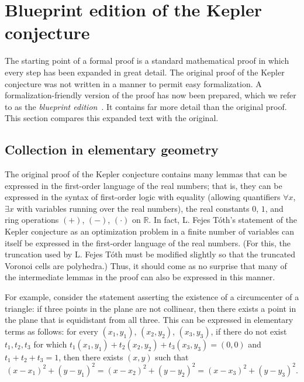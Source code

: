 \documentclass[11pt]{amsart}
\newcommand{\ring}[1]{\mathbb{#1}}
\begin{document}
\section{Blueprint edition of the Kepler conjecture}
\label{sec:blueprint}

The starting point of a formal proof is a standard mathematical proof in which every step
has been expanded in great detail.  The original proof of the Kepler conjecture was not written
in a manner to permit easy formalization.  A formalization-friendly version of the proof has
now been prepared, which we refer to as the {\it blueprint edition}~\cite{hales:2008:blueprint, hales:2008:collection}.  It contains far more detail than the original proof.  This section 
compares this expanded text with the original.


\subsection*{Collection in elementary geometry}

The original proof of the Kepler conjecture contains many lemmas that can be
expressed in the first-order language of the real numbers; that is, they can be expressed in
the syntax of first-order logic with equality (allowing quantifiers $\forall x$, $\exists x$ with variables
running over the real numbers), the real constants $0$, $1$, and ring operations $(+)$, $(-)$,
$(\cdot)$ on $\ring{R}$.  In fact, L. Fejes T\'oth's statement of the Kepler conjecture as
an optimization problem in a finite number of variables can itself be expressed in the
first-order language of the real numbers.  (For this, the truncation used by L. Fejes T\'oth must be modified slightly so that the truncated Voronoi cells are polyhedra.)  Thus, it should come as no surprise that many
of the intermediate lemmas in the proof can also be expressed in this manner.

For example, consider the statement asserting the existence of a circumcenter of a triangle: 
if three points in the plane are not collinear, then there exists a
point in the plane that is equidistant from all three.  This can be expressed in elementary terms
as follows:  for every $(x_1,y_1)$, $(x_2,y_2)$, $(x_3,y_3)$, if there do not exist $t_1,t_2,t_3$
for which $t_1 (x_1,y_1) + t_2 (x_2,y_2)+ t_3 (x_3,y_3) = (0,0)$ and $t_1+t_2+t_3=1$, then there exists
$(x,y)$ such that 
$$
  (x-x_1)^2 + (y-y_1)^2 = (x-x_2)^2 + (y-y_2)^2 = (x-x_3)^2 + (y-y_3)^2. 
$$
\end{document}
